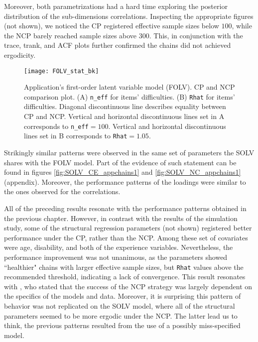 Moreover, both parametrizations had a hard time exploring the posterior distribution of the sub-dimensions correlations. Inspecting the appropriate figures (not shown), we noticed the CP registered effective sample sizes below $100$, while the NCP barely reached sample sizes above $300$. This, in conjunction with the trace, trank, and ACF plots further confirmed the chains did not achieved ergodicity.
%
\begin{figure}[H]
	\centering
	\texttt{[image: FOLV\_stat\_bk]}
	\caption[Application's first-order latent variable model (FOLV). CP and NCP comparison plot.]%
	{Application's first-order latent variable model (FOLV). CP and NCP comparison plot. (A) \texttt{n\_eff} for items' difficulties. (B) \texttt{Rhat} for items' difficulties. Diagonal discontinuous line describes equality between CP and NCP. Vertical and horizontal discontinuous lines set in A corresponds to \texttt{n\_eff}$=100$. Vertical and horizontal discontinuous lines set in B corresponds to \texttt{Rhat}$=1.05$.}
	\label{fig:FOLV_stat1}
\end{figure}

Strikingly similar patterns were observed in the same set of parameters the SOLV shares with the FOLV model. Part of the evidence of such statement can be found in figures \ref{fig:SOLV_CE_appchains1} and \ref{fig:SOLV_NC_appchains1} (appendix). Moreover, the performance patterns of the loadings were similar to the ones observed for the correlations.

All of the preceding results resonate with the performance patterns obtained in the previous chapter. However, in contrast with the results of the simulation study, some of the structural regression parameters (not shown) registered better performance under the CP, rather than the NCP. Among these set of covariates were age, disability, and both of the experience variables. Nevertheless, the performance improvement was not unanimous, as the parameters showed ``healthier" chains with larger effective sample sizes, but \texttt{Rhat} values above the recommended threshold, indicating a lack of convergence. This result resonates with \citet{Papaspiliopoulos_et_al_2007}, who stated that the success of the NCP strategy was largely dependent on the specifics of the models and data. Moreover, it is surprising this pattern of behavior was not replicated on the SOLV model, where all of the structural parameters seemed to be more ergodic under the NCP. The latter lead us to think, the previous patterns resulted from the use of a possibly miss-specified model.

